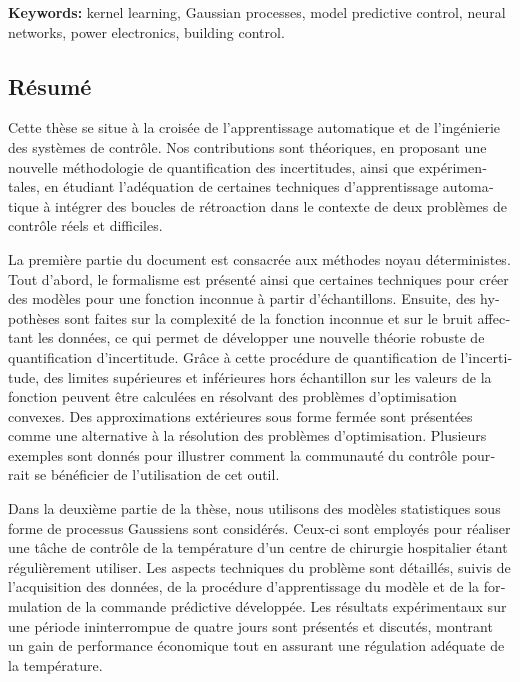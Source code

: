 \smallbreak
\textbf{Keywords:} kernel learning, Gaussian processes, model predictive control, neural networks, power electronics, building control.

%

\begin{otherlanguage}{french}
\cleardoublepage

\chapter*{Résumé}

Cette thèse se situe à la croisée de l'apprentissage automatique et de l'ingénierie des systèmes de contrôle. Nos contributions sont théoriques, en proposant une nouvelle méthodologie de quantification des incertitudes, ainsi que expérimentales, en étudiant l'adéquation de certaines techniques d'apprentissage automatique à intégrer des boucles de rétroaction dans le contexte de deux problèmes de contrôle réels et difficiles.

La première partie du document est consacrée aux méthodes noyau déterministes. Tout d'abord, le formalisme est présenté ainsi que certaines techniques pour créer des modèles pour une fonction inconnue à partir d'échantillons. Ensuite, des hypothèses sont faites sur la complexité de la fonction inconnue et sur le bruit affectant les données, ce qui permet de développer une nouvelle théorie robuste de quantification d'incertitude. Grâce à cette procédure de quantification de l'incertitude, des limites supérieures et inférieures hors échantillon sur les valeurs de la fonction peuvent être calculées en résolvant des problèmes d'optimisation convexes. Des approximations extérieures sous forme fermée sont présentées comme une alternative à la résolution des problèmes d'optimisation. Plusieurs exemples sont donnés pour illustrer comment la communauté du contrôle pourrait se bénéficier de l'utilisation de cet outil.

Dans la deuxième partie de la thèse, nous utilisons des modèles statistiques sous forme de processus Gaussiens sont considérés. Ceux-ci sont employés pour réaliser une tâche de contrôle de la température d'un centre de chirurgie hospitalier étant régulièrement utiliser. Les aspects techniques du problème sont détaillés, suivis de l'acquisition des données, de la procédure d'apprentissage du modèle et de la formulation de la commande prédictive développée. Les résultats expérimentaux sur une période ininterrompue de quatre jours sont présentés et discutés, montrant un gain de performance économique tout en assurant une régulation adéquate de la température.


\end{otherlanguage}
